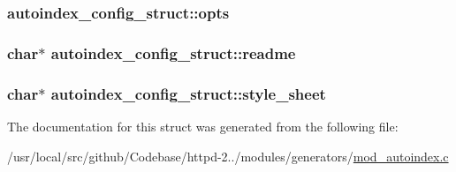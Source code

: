 \subsubsection[{\texorpdfstring{opts}{opts}}]{ autoindex\+\_\+config\+\_\+struct\+::opts}\hypertarget{structautoindex__config__struct_a1d0050b118e98ff9ef17d05939a6fca0}{}\label{structautoindex__config__struct_a1d0050b118e98ff9ef17d05939a6fca0}
\subsubsection[{\texorpdfstring{readme}{readme}}]{\setlength{\rightskip}{0pt plus 5cm}char$\ast$ autoindex\+\_\+config\+\_\+struct\+::readme}\hypertarget{structautoindex__config__struct_ac753678746360f12b0868ca52c46727a}{}\label{structautoindex__config__struct_ac753678746360f12b0868ca52c46727a}
\subsubsection[{\texorpdfstring{style\+\_\+sheet}{style_sheet}}]{\setlength{\rightskip}{0pt plus 5cm}char$\ast$ autoindex\+\_\+config\+\_\+struct\+::style\+\_\+sheet}\hypertarget{structautoindex__config__struct_a6b032865af8223dddc2f32f88d6b9d5c}{}\label{structautoindex__config__struct_a6b032865af8223dddc2f32f88d6b9d5c}


The documentation for this struct was generated from the following file\+:\begin{DoxyCompactItemize}
\item 
/usr/local/src/github/\+Codebase/httpd-\/2../modules/generators/\hyperlink{mod__autoindex_8c}{mod\+\_\+autoindex.\+c}\end{DoxyCompactItemize}
